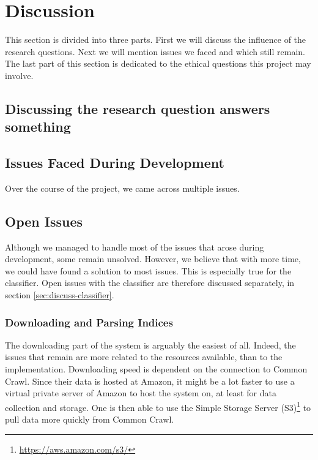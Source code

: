 \chapter{Discussion}\label{sec:discussion}

This section is divided into three parts. First we will discuss the influence of the research questions. Next we will mention issues we faced and which still remain. The last part of this section is dedicated to the ethical questions this project may involve.

\section{Discussing the research question answers something} 

\section{Issues Faced During Development}
Over the course of the project, we came across multiple issues. 
    


\section{Open Issues}\label{sec:Discussion - Open Issues}
Although we managed to handle most of the issues that arose during development, some remain unsolved. However, we believe that with more time, we could have found a solution to most issues. This is especially true for the classifier. Open issues with the classifier are therefore discussed separately, in section \ref{sec:discuss-classifier}.

\subsection{Downloading and Parsing Indices}
The downloading part of the system is arguably the easiest of all. Indeed, the issues that remain are more related to the resources available, than to the implementation. Downloading speed is dependent on the connection to Common Crawl. Since their data is hosted at Amazon, it might be a lot faster to use a virtual private server of Amazon to host the system on, at least for data collection and storage. One is then able to use the Simple Storage Server (S3)\footnote{\url{https://aws.amazon.com/s3/}} to pull data more quickly from Common Crawl.

